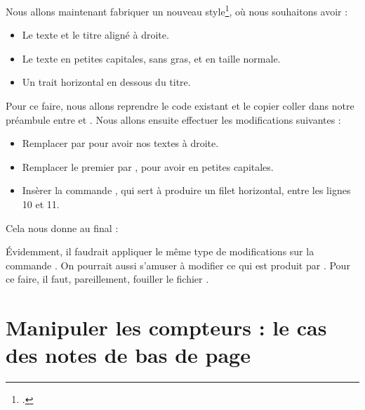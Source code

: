 Nous allons maintenant fabriquer un nouveau style\footcite[Nous nous inspirons ici du style de la classe ][]{bredele}, où
nous souhaitons avoir :
\begin{itemize}
\item Le texte  et le titre aligné à droite.
\item Le texte  en  petites capitales, sans gras, et en taille normale.
\item Un trait horizontal en dessous du titre.
\end{itemize}

Pour ce faire, nous allons reprendre le code existant et le copier coller dans notre préambule entre  et . Nous allons ensuite effectuer les modifications suivantes :

\begin{itemize}
\item Remplacer  par  pour avoir nos textes à droite.
\item Remplacer le premier  par , pour avoir  en petites capitales.
\item Insèrer la commande , qui sert à produire un filet horizontal, entre les lignes 10 et 11.
\end{itemize}

Cela nous donne au final :

\begin{latexcode}
\makeatletter
\def\@makechapterhead#1{%
  \vspace*{50\p@}%
  {\parindent \z@ \raggedleft \normalfont
    \ifnum \c@secnumdepth >\m@ne
      \if@mainmatter
       \scshape \@chapapp\space \thechapter
        \par\nobreak
        \vskip 20\p@
      \fi
    \fi
    \interlinepenalty\@M
    \Huge \bfseries #1\par\nobreak
    \hrulefill
    \vskip 40\p@
  }}
\makeatother
\end{latexcode}

Évidemment, il faudrait appliquer le même type de modifications sur la commande . On pourrait aussi s'amuser à modifier ce qui est produit par . Pour ce faire, il faut, pareillement, fouiller le fichier .

\section[Manipuler les compteurs]{Manipuler les compteurs : le cas des notes de bas de page}\label{manipcompteurs}

